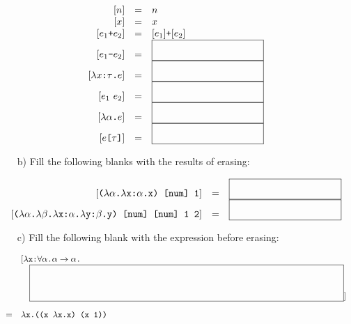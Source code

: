 \begin{enumerate}
{
\[
\begin{array}{rcl}
\lbrack n\rbrack &=& n \\
\lbrack x\rbrack &=& x \\
\lbrack e_1\code{+}e_2\rbrack &=& \lbrack e_1\rbrack\code{+}\lbrack e_2\rbrack \\
\lbrack e_1\code{-}e_2\rbrack &=& \sblank \\
\lbrack \lambda x\code{:}\tau\code{.}e\rbrack &=& \sblank \\
\lbrack e_1\ e_2\rbrack &=& \sblank \\
\lbrack \lambda\alpha\code{.}e\rbrack &=& \sblank \\
\lbrack e\code{[}\tau\code{]}\rbrack &=& \sblank \\
\end{array}
\]
}

\begin{itemize}
\item[b)] Fill the following blanks with the results of erasing:
\end{itemize}

{
\[
\begin{array}{rcl}
\lbrack
\code{($\lambda\alpha$.$\lambda$x:$\alpha$.x) [num] 1}
\rbrack
&=&\sblank \\
\lbrack
\code{($\lambda\alpha$.$\lambda\beta$.$\lambda$x:$\alpha$.$\lambda$y:$\beta$.y) [num] [num] 1 2}
\rbrack
&=&\sblank \\
\end{array}
\]
}

\begin{itemize}
\item[c)] Fill the following blank with the expression before erasing:
\end{itemize}

{
\[
\begin{array}{rl@{\hskip-10pt}l}
&\lbrack\code{$\lambda$x:$\forall\alpha$.$\alpha\rightarrow\alpha$.} \\
&\lblank&\rbrack \\[10pt]
=&\code{$\lambda$x.((x $\lambda$x.x) (x 1))}
\end{array}
\]
}


\end{enumerate}
